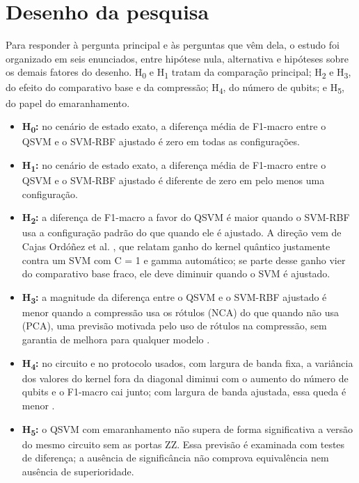 \documentclass[conference]{IEEEtran}
\newcommand{\svm}{\mbox{SVM-RBF}}
\begin{document}
\section{Desenho da pesquisa}
\label{sec:desenho}

Para responder à pergunta principal e às perguntas que vêm dela, o estudo foi organizado em seis enunciados, entre hipótese nula, alternativa e hipóteses sobre os demais fatores do desenho. H\textsubscript{0} e H\textsubscript{1} tratam da comparação principal; H\textsubscript{2} e H\textsubscript{3}, do efeito do comparativo base e da compressão; H\textsubscript{4}, do número de qubits; e H\textsubscript{5}, do papel do emaranhamento.

\begin{itemize}
\item \textbf{H\textsubscript{0}:} no cenário de estado exato, a diferença média de F1-macro entre o QSVM e o \svm{} ajustado é zero em todas as configurações.
\item \textbf{H\textsubscript{1}:} no cenário de estado exato, a diferença média de F1-macro entre o QSVM e o \svm{} ajustado é diferente de zero em pelo menos uma configuração.
\item \textbf{H\textsubscript{2}:} a diferença de F1-macro a favor do QSVM é maior quando o \svm{} usa a configuração padrão do que quando ele é ajustado. A direção vem de Cajas Ordóñez et al. \cite{cajas2025}, que relatam ganho do kernel quântico justamente contra um SVM com C = 1 e gamma automático; se parte desse ganho vier do comparativo base fraco, ele deve diminuir quando o SVM é ajustado.
\item \textbf{H\textsubscript{3}:} a magnitude da diferença entre o QSVM e o \svm{} ajustado é menor quando a compressão usa os rótulos (NCA) do que quando não usa (PCA), uma previsão motivada pelo uso de rótulos na compressão, sem garantia de melhora para qualquer modelo \cite{hassan2026}.
\item \textbf{H\textsubscript{4}:} no circuito e no protocolo usados, com largura de banda fixa, a variância dos valores do kernel fora da diagonal diminui com o aumento do número de qubits e o F1-macro cai junto; com largura de banda ajustada, essa queda é menor \cite{thanasilp2024,shaydulin2021}.
\item \textbf{H\textsubscript{5}:} o QSVM com emaranhamento não supera de forma significativa a versão do mesmo circuito sem as portas ZZ. Essa previsão é examinada com testes de diferença; a ausência de significância não comprova equivalência nem ausência de superioridade.
\end{itemize}
\end{document}
